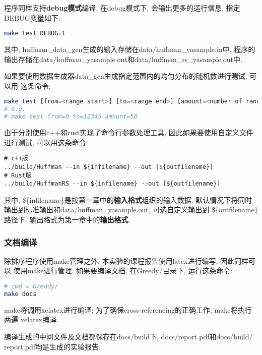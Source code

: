 程序同样支持\textbf{debug模式}编译. 在debug模式下, 会输出更多的运行信息.
指定DEBUG变量如下:
\begin{lstlisting}[language=bash]
make test DEBUG=1
\end{lstlisting}

其中, huffman\_data\_gen生成的输入存储在data/huffman\_yasample.in中,
程序的输出存储在data/huffman\_yasample.out和data/huffman\_rs\_yasample.out中. \par

如果要使用数据生成器data\_gen生成指定范围内的均匀分布的随机数进行测试, 可以用
这条命令:
\begin{lstlisting}[language=bash]
make test [from=<range start>] [to=<range end>] [amount=<number of random numbers>]
# e.g. 
# make test from=0 to=12345 amount=50
\end{lstlisting}

由于分别使用c++和rust实现了命令行参数处理工具, 因此如果要使用自定义文件进行测试,
可以用这条命令:
\begin{lstlisting}
# c++版
../build/Huffman --in ${infilename} --out [${outfilename}]
# Rust版
../build/HuffmanRS --in ${infilename} --out [${outfilename}]
\end{lstlisting}
其中, \$\{infilename\}是按第一章中的\textbf{输入格式}组织的输入数据.
默认情况下将同时输出到标准输出和data/huffman\_yasample.out, 可选自定义输出到
\$\{outfilename\}路径下. 输出格式为第一章中的\textbf{输出格式}.

\subsubsection{文档编译}
除排序程序使用make管理之外, 本实验的课程报告使用latex进行编写, 因此同样可以
使用make进行管理. 如果要编译文档, 在Greedy/目录下, 运行这条命令:
\begin{lstlisting}[language=bash]
# cwd = Greddy/
make docs
\end{lstlisting}
make将调用xelatex进行编译; 为了确保cross-referencing的正确工作, make将执行两遍
xelatex编译.\par
编译生成的中间文件及文档都保存在docs/build下, docs/report.pdf和docs/build/
report.pdf均是生成的实验报告.

